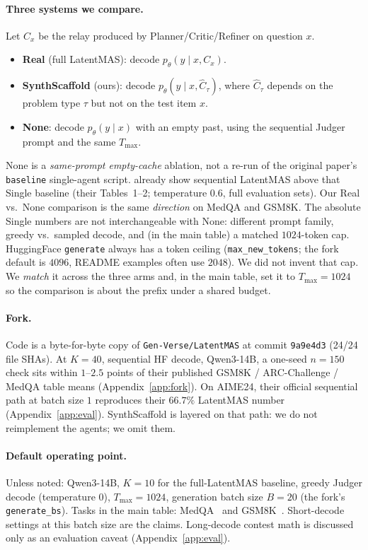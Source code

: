 \documentclass[11pt]{article}
\begin{document}
\paragraph{Three systems we compare.}
Let $C_x$ be the relay produced by Planner/Critic/Refiner on question
$x$.
\begin{itemize}
\item \textbf{Real} (full LatentMAS): decode $p_\theta(y\mid x, C_x)$.
\item \textbf{SynthScaffold} (ours): decode $p_\theta(y\mid x, \widehat C_\tau)$,
where $\widehat C_\tau$ depends on the problem type $\tau$ but not on
the test item $x$.
\item \textbf{None}: decode $p_\theta(y\mid x)$ with an empty past, using
the sequential Judger prompt and the same $T_{\max}$.
\end{itemize}
None is a \emph{same-prompt empty-cache} ablation, not a re-run of the
original paper's \texttt{baseline} single-agent script.
\citet{zou2025latentmas} already show sequential LatentMAS above that
Single baseline (their Tables~1--2; temperature $0.6$, full evaluation
sets).
Our Real vs.\ None comparison is the same \emph{direction} on MedQA and
GSM8K.
The absolute Single numbers are not interchangeable with None: different
prompt family, greedy vs.\ sampled decode, and (in the main table) a
matched $1024$-token cap.
HuggingFace \texttt{generate} always has a token ceiling
(\texttt{max\_new\_tokens}; the fork default is $4096$, README examples
often use $2048$).
We did not invent that cap.
We \emph{match} it across the three arms and, in the main table, set it
to $T_{\max}{=}1024$ so the comparison is about the prefix under a
shared budget.

\paragraph{Fork.}
Code is a byte-for-byte copy of \texttt{Gen-Verse/LatentMAS} at commit
\texttt{9a9e4d3} (24/24 file SHAs).
At $K{=}40$, sequential HF decode, Qwen3-14B, a one-seed $n{=}150$ check
sits within $1$--$2.5$ points of their published GSM8K / ARC-Challenge /
MedQA table means (Appendix~\ref{app:fork}).
On AIME24, their official sequential path at batch size $1$ reproduces
their $66.7\%$ LatentMAS number (Appendix~\ref{app:eval}).
SynthScaffold is layered on that path: we do not reimplement the agents;
we omit them.

\paragraph{Default operating point.}
Unless noted: Qwen3-14B, $K{=}10$ for the full-LatentMAS baseline,
greedy Judger decode (temperature $0$), $T_{\max}{=}1024$, generation
batch size $B{=}20$ (the fork's \texttt{generate\_bs}).
Tasks in the main table: MedQA~\citep{jin2021medqa} and
GSM8K~\citep{cobbe2021gsm8k}.
Short-decode settings at this batch size are the claims.
Long-decode contest math is discussed only as an evaluation caveat
(Appendix~\ref{app:eval}).
\end{document}
